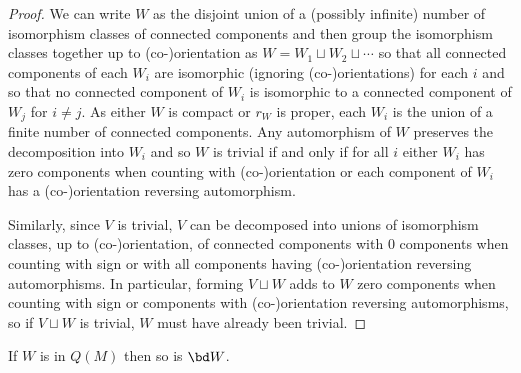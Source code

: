 \begin{proof}
	We can write $W$ as the disjoint union of a (possibly infinite) number of isomorphism classes of connected components and then group the isomorphism classes together up to (co-)orientation as $W = W_1 \sqcup W_2 \sqcup \cdots$ so that all connected components of each $W_i$ are isomorphic (ignoring (co-)orientations) for each $i$ and so that no connected component of $W_i$ is isomorphic to a connected component of $W_j$ for $i\neq j$.
	As either $W$ is compact or $r_W$ is proper, each $W_i$ is the union of a finite number of connected components.
	Any automorphism of $W$ preserves the decomposition into $W_i$ and so $W$ is trivial if and only if for all $i$ either $W_i$ has zero components when counting with (co-)orientation or each component of $W_i$ has a (co-)orientation reversing automorphism.

	Similarly, since $V$ is trivial, $V$ can be decomposed into unions of isomorphism classes, up to (co-)orienta\-tion, of connected components with $0$ components when counting with sign or with all components having (co-)orientation reversing automorphisms.
	In particular, forming $V \sqcup W$ adds to $W$ zero components when counting with sign or components with (co-)orientation reversing automorphisms, so if $V \sqcup W$ is trivial, $W$ must have already been trivial.
\end{proof}

\begin{lemma}\label{L: bd defined}
	If $W$ is in $Q(M)$ then so is $\bd W$.
\end{lemma}

